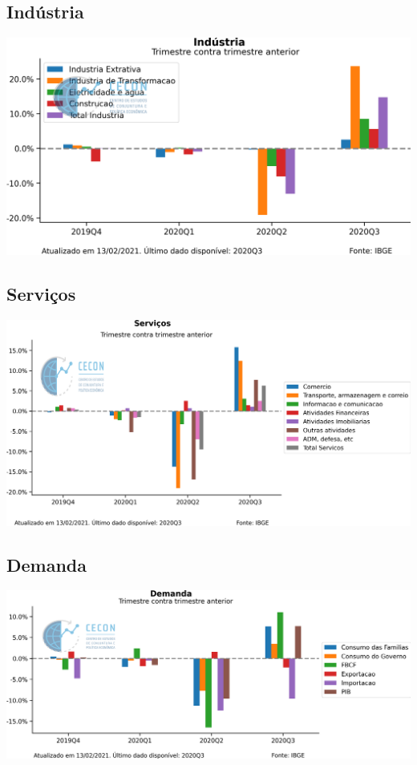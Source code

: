 \documentclass{SelfArx}
\begin{document}
\subsection*{Indústria}
\label{sec:org532be0a}

\begin{center}
\includegraphics[width=.9\linewidth]{./figs/PIB/Industria.png}
\end{center}


\subsection*{Serviços}
\label{sec:org44d0b5e}

\begin{center}
\includegraphics[width=.9\linewidth]{./figs/PIB/Servicos.png}
\end{center}

\subsection*{Demanda}
\label{sec:org284b61e}

\begin{center}
\includegraphics[width=.9\linewidth]{./figs/PIB/Demanda.png}
\end{center}
\end{document}
